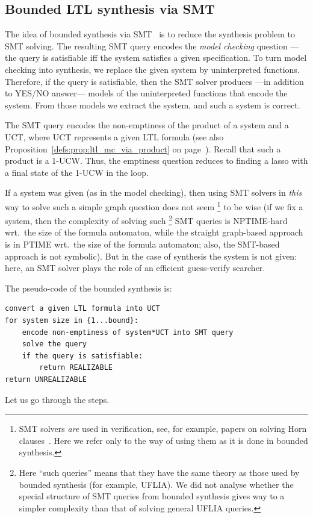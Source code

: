 \subsection*{Bounded LTL synthesis via SMT}\label{page:defs:bounded_synthesis}

The idea of bounded synthesis via SMT~\cite{BS} is to reduce the synthesis problem to SMT solving.
The resulting SMT query encodes the \emph{model checking} question%
---the query is satisfiable iff the system satisfies a given specification.
To turn model checking into synthesis, 
we replace the given system by uninterpreted functions.
Therefore, if the query is satisfiable, then the SMT solver produces%
---in addition to YES/NO answer---%
models of the uninterpreted functions that encode the system.
From those models we extract the system, and such a system is correct.

The SMT query encodes the non-emptiness of the product of a system and a UCT,
where UCT represents a given LTL formula
(see also Proposition~\ref{defs:prop:ltl_mc_via_product} on page~\pageref{page:defs:prop:ltl_mc_via_product}).
Recall that such a product is a 1-UCW.
Thus,
the emptiness question reduces to finding a lasso
with a final state of the 1-UCW in the loop.

If a system was given (as in the model checking),
then using SMT solvers in \emph{this} way to solve such a simple graph question does not seem%
\footnote{SMT solvers \emph{are} used in verification, see, for example, papers on solving Horn clauses~\cite{bjornerhorn,RybHornSynth,BeDi}.
 Here we refer only to the way of using them as it is done in bounded synthesis.%
} to be wise
(if we fix a system,
 then the complexity of solving such%
 \footnote{Here ``such queries'' means that they have the same theory as those used by bounded synthesis
 (for example, UFLIA).
 We did not analyse whether the special structure of SMT queries from bounded synthesis
 gives way to a simpler complexity than that of solving general UFLIA queries.%
 }
 SMT queries is NPTIME-hard wrt.\ the size of the formula automaton,
 while the straight graph-based approach is in PTIME wrt.\ the size of the formula automaton;
 also, the SMT-based approach is not symbolic).
But in the case of synthesis the system is not given:
here, an SMT solver plays the role of an efficient guess-verify searcher.

The pseudo-code of the bounded synthesis is:
\begin{verbatim}
convert a given LTL formula into UCT
for system size in {1...bound}:
    encode non-emptiness of system*UCT into SMT query
    solve the query
    if the query is satisfiable:
        return REALIZABLE
return UNREALIZABLE
\end{verbatim}
Let us go through the steps.

